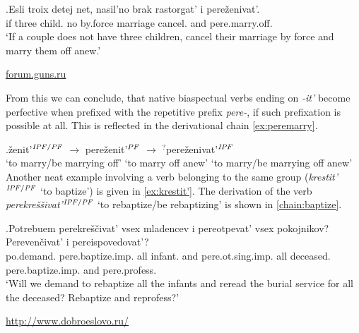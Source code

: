 \exg.\label{ex:perezenivat'}Esli troix detej net, nasil'no brak rastorgat' i pere\v{z}enivat'.\\
if three child. no by.force marriage cancel. and pere.marry.off.\\
\vspace{0.5em}
`If a couple does not have three children, cancel their marriage by force and marry them off anew.'
\begin{flushright}
\vspace{-0.5em}
\url{forum.guns.ru}
\end{flushright}

From this we can conclude, that native biaspectual verbs ending on \textit{-it'} become perfective when prefixed with the repetitive prefix \textit{pere-}, if such prefixation is possible at all. This is reflected in the derivational chain \ref{ex:peremarry}.

\exg.\label{ex:peremarry}\v{z}enit'$^{{\mathit{IPF}}/{\mathit{PF}}}$ $\rightarrow$ pere\v{z}enit'$^{{\mathit{PF}}}$ $\rightarrow$ $^?$pere\v{z}enivat'$^{{\mathit{IPF}}}$ \\
{`to marry/be marrying off'} {} {`to marry off anew'} {} {`to marry/be marrying off anew'}\\

Another neat example involving a verb belonging to the same group (\textit{krestit'}$^{{\mathit{IPF}}/{\mathit{PF}}}$ `to baptize') is given in \ref{ex:krestit'}. The derivation of the verb \textit{perekre\v{s}\v{s}ivat'}$^{{\mathit{IPF}}/{\mathit{PF}}}$ `to rebaptize/be rebaptizing' is shown in \ref{chain:baptize}.

\exg.\label{ex:krestit'}Potrebuem perekre\v{s}\v{c}ivat' vsex mladencev i pereotpevat' vsex pokojnikov? Pereven\v{c}ivat' i pereispovedovat'?\\
po.demand. pere.baptize.imp. all infant. and pere.ot.sing.imp. all deceased. pere.baptize.imp. and pere.profess.\\
\vspace{0.5em}
`Will we demand to rebaptize all the infants and reread the burial service for all the deceased? Rebaptize and reprofess?'
\begin{flushright}
\vspace{-0.5em}
\url{http://www.dobroeslovo.ru/}
\end{flushright}


